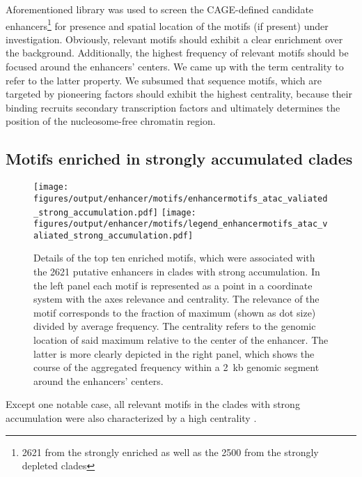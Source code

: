 Aforementioned library was used to screen the CAGE-defined candidate enhancers\footnote{\num{2621} from the strongly enriched as well as the \num{2500} from the strongly depleted clades} for presence and spatial location of the motifs (if present) under investigation. Obviously, relevant motifs should exhibit a clear enrichment over the background. Additionally, the highest frequency of relevant motifs should be focused around the enhancers' centers. We came up with the term centrality to refer to the latter property. We subsumed that sequence motifs, which are targeted by pioneering factors should exhibit the highest centrality, because their binding recruits secondary transcription factors and ultimately determines the position of the nucleosome-free chromatin region. 

\subsection{Motifs enriched in strongly accumulated clades}
\label{chap:r:enhancers:motifs:tfs:accu}

\begin{figure}[!htb]
	\centering
	\texttt{[image: figures/output/enhancer/motifs/enhancermotifs\_atac\_valiated\_strong\_accumulation.pdf]} 
	\texttt{[image: figures/output/enhancer/motifs/legend\_enhancermotifs\_atac\_valiated\_strong\_accumulation.pdf]} 
	\caption{Details of the top ten enriched motifs, which were associated with the \num{2621} putative enhancers in clades with strong accumulation. In the left panel each motif is represented as a point in a coordinate system with the axes relevance and centrality. The relevance of the motif corresponds to the fraction of maximum (shown as dot size) divided by average frequency. The centrality refers to the genomic location of said maximum relative to the center of the enhancer. The latter is more clearly depicted in the right panel, which shows the course of the aggregated frequency within a \SI{2}{\kilo b} genomic segment around the enhancers' centers.}
	\label{fig:enhancers:motifs:atac_valiated_strong_accumulation}
\end{figure}

Except one notable case, all relevant motifs in the clades with strong accumulation were also characterized by a high centrality . 

